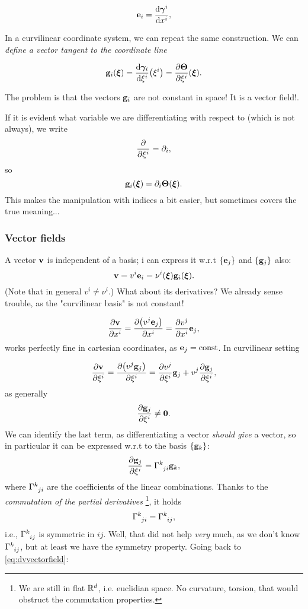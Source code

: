 \documentclass[../main.tex]{subfiles}
\begin{document}
\begin{equation}
	\vb{e}_i = \dv{\vb*{\gamma}^i}{x^i},
\end{equation}

In a curvilinear coordinate system, we can repeat the same construction. We can \textit{define a vector tangent to the coordinate line}

\begin{equation}
	\vb{g}_i \qty(\vb*{\xi})=\dv{\vb*{\gamma}_i}{\xi^i}\qty(\xi^i) = \pdv{\vb*{\Theta}}{\xi^i}\qty(\vb*{\xi}).
\end{equation}

The problem is that the vectors $\vb{g}_i$ are not constant in space! It is a vector field!.

\begin{remark}
	If it is evident what variable we are differentiating with respect to (which is not always), we write
	\[
		\pdv{\xi^i} = \partial_{i},
	\]
	so
	\[
		\vb{g}_i\qty(\vb*{\xi}) = \partial_{i} \vb*{\Theta}\qty(\vb*{\xi}).
	\]
	This makes the manipulation with indices a bit easier, but sometimes covers the true meaning...
\end{remark}

\subsubsection{Vector fields}
\label{sec:vector_fields}

A vector $\vb{v}$ is independent of a basis; i can express it w.r.t $\qty{\vb{e}_j}$ and $\qty{\vb{g}_j}$ also:
\[
	\vb{v}=v^i \vb{e}_i = \nu^i\qty(\vb*{\xi}) \vb{g}_i\qty(\vb*{\xi}).
\]
(Note that in general $v^i \neq \nu^i$.) What about its derivatives? We already sense trouble, as the "curvilinear basis" is not constant!

\[
	\pdv{\vb{v}}{x^i}=\pdv{\qty(v^j \vb{e}_j)}{x^i} = \pdv{v^j}{x^i}\vb{e}_j,
\]
works perfectly fine in cartesian coordinates, as $\vb{e}_j = \text{const}$. In curvilinear setting

\begin{equation}
	\label{eq:dvvectorfield}
	\pdv{\vb{v}}{\xi^i}=\pdv{\qty(v^j \vb{g}_j)}{\xi^i}= \pdv{v^j}{\xi^i}\vb{g}_j + v^j \pdv{\vb{g}_j}{\xi^i},
\end{equation}
as generally
\[
	\pdv{\vb{g}_j}{\xi^i} \neq \vb{0}.
\]
We can identify the last term, as differentiating a vector \textit{should give} a vector, so in particular it can be expressed w.r.t to the basis $\qty{\vb{g}_k}$:
\[
	\pdv{\vb{g}_j}{\xi^i} = \Gamma \indices{^k_{ji}} \vb{g}_k,
\]
where $\Gamma \indices{^k_{ji}} $ are the coefficients of the linear combinations. Thanks to the \textit{commutation of the partial derivatives} \footnote{We are still in flat ${\mathbb R}^d$, i.e. euclidian space. No curvature, torsion, that would obstruct the commutation properties.}, it holds
\begin{equation}
	\label{eq:symmetry_christoffel}
	\Gamma \indices{^k_{ji}} = \Gamma \indices{^k_{ij}},
\end{equation}
i.e., $\Gamma \indices{^k_{ij}}$ is symmetric in $ij$. Well, that did not help \textit{very} much, as we don't know $\Gamma \indices{^k_{ij}}$, but at least we have the symmetry property. Going back to \ref{eq:dvvectorfield}:
\end{document}
